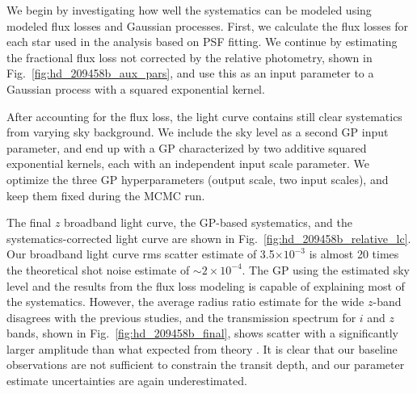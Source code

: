 \documentclass[useAMS,usenatbib]{mn2e}
\begin{document}
We begin by investigating how well the systematics can be modeled using modeled flux losses and Gaussian processes. 
First, we calculate the flux losses for each star used in the analysis based on PSF fitting. We continue by estimating 
the fractional flux loss not corrected by the relative photometry, shown in Fig.~\ref{fig:hd_209458b_aux_pars}, and use 
this as an input parameter to a Gaussian process with a squared exponential kernel.

After accounting for the flux loss, the light curve contains still clear systematics from varying sky background. We 
include the sky level as a second GP input parameter, and end up with a GP characterized by two additive squared 
exponential kernels, each with an independent input scale parameter. We optimize the three GP hyperparameters (output 
scale, two input scales), and keep them fixed during the MCMC run.

The final $z$ broadband light curve, the GP-based systematics, and the systematics-corrected light curve are shown in 
Fig.~\ref{fig:hd_209458b_relative_lc}. Our broadband light curve rms scatter estimate of 3.5$\times 10^{-3}$
is almost 20 times the theoretical shot noise estimate of $\sim2\times10^{-4}$. The GP using the estimated sky level
and the results from the flux loss modeling is capable of explaining most of the systematics. However, the average
radius ratio estimate for the wide $z$-band disagrees with the previous studies, and the transmission spectrum for $i$
and $z$ bands, shown in Fig.~\ref{fig:hd_209458b_final}, shows scatter with a significantly larger amplitude than what
expected from theory \citep[or observed previously, for example][]{Sing2008,Evans2015}. It is clear that our
baseline observations are not sufficient to constrain the transit depth, and our parameter estimate uncertainties are
again underestimated.
\end{document}
